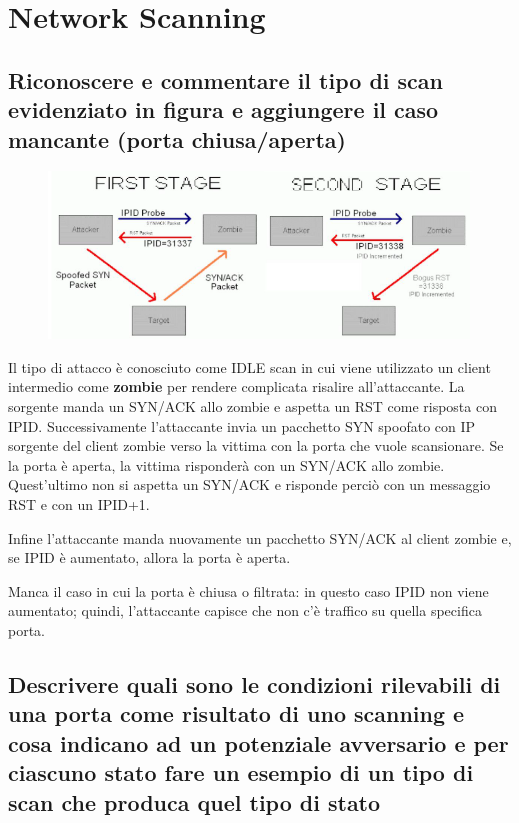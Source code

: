\documentclass{report}
\begin{document}
\chapter{Network Scanning}
\section{Riconoscere e commentare il tipo di scan evidenziato in figura e aggiungere il caso mancante (porta chiusa/aperta)}
\begin{figure}[H]
    \centering
    \includegraphics[width=1\linewidth]{images/scanEvidenziato.png}
\end{figure}

\noindent Il tipo di attacco è conosciuto come IDLE scan in cui viene utilizzato 
un client intermedio come \textbf{zombie} per rendere complicata risalire all'attaccante. 
La sorgente manda un SYN/ACK allo zombie e aspetta un RST come risposta con IPID. 
Successivamente l'attaccante invia un pacchetto SYN spoofato con IP sorgente del client zombie verso 
la vittima con la porta che vuole scansionare. 
Se la porta è aperta, la vittima risponderà con un SYN/ACK allo zombie. Quest'ultimo non si aspetta un SYN/ACK e risponde 
perciò con un messaggio RST e con un IPID+1. 

\noindent Infine l'attaccante manda nuovamente un pacchetto SYN/ACK al client zombie e, se IPID è aumentato, allora la porta è aperta.

\noindent Manca il caso in cui la porta è chiusa o filtrata: in questo caso IPID non viene aumentato; quindi, l'attaccante capisce che non c'è traffico su quella specifica porta.

\section{Descrivere quali sono le condizioni rilevabili di una porta come risultato di uno scanning e cosa indicano ad un potenziale avversario e 
per ciascuno stato fare un esempio di un tipo di scan che produca quel tipo di stato}
\end{document}
